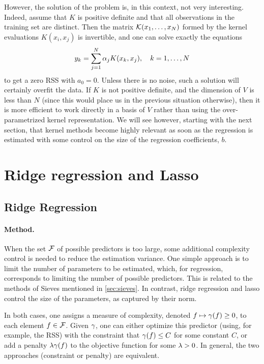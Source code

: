 However, the solution of the problem is, in this context, not very interesting. Indeed, assume that $K$ is positive definite and that all observations in the training set are distinct. Then the matrix ${\mathcal K}(x_1, \ldots, x_N)$ formed by the kernel evaluations $K(x_i, x_j)$ is invertible, and one can solve exactly the equations
\[
y_k = \sum_{j=1}^N \alpha_j K(x_k,x_j), \quad k=1, \ldots, N
\]
to get a zero RSS with ${a_0} = 0$. Unless there is no noise, such a solution will certainly overfit the data. If $K$ is not positive definite, and the dimension of $V$ is less than $N$ (since this would place us in the previous situation otherwise), then it is more efficient to work directly in a basis of $V$ rather than using the over-parametrized kernel representation. We will see however, starting with the next section, that kernel methods become highly relevant as soon as the regression is estimated with some control on the size of the regression coefficients, $b$.


\section{Ridge regression and Lasso}

\subsection{Ridge Regression}
\label{sec:ridge}

\paragraph{Method.}
When the set ${\mathcal F}$ of possible predictors  is too large, some additional complexity control is needed to reduce the estimation variance.
One simple approach is to limit the number of parameters to be estimated, which, for regression, corresponds to limiting the number of possible predictors. This is related to the methods of Sieves mentioned in \cref{sec:sieves}. In contrast, ridge regression and lasso control the size of the parameters, as captured by their norm. 

In both cases, one assigns a  measure of complexity, denoted $f \mapsto \gamma(f) \geq 0$,  to each element $f\in{\mathcal F}$. 
Given $\gamma$, one can either optimize this predictor (using, for example, the RSS) with the constraint that $\gamma(f) \leq C$ for some constant $C$, or add a penalty $\lambda \gamma(f)$ to the objective function for some $\lambda>0$.
In general, the two approaches (constraint or penalty) are equivalent. 


